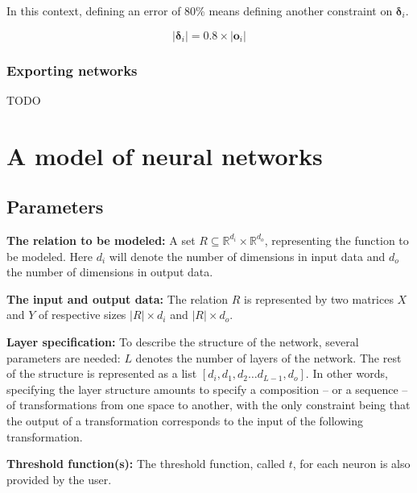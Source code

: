 \documentclass[a4paper, 10pt]{article}
\begin{document}
In this context, defining an error of 80\% means defining another constraint on
$\boldsymbol{\delta}_i$.

\begin{equation*}
    |\boldsymbol{\delta}_i| = 0.8 \times |\mathbf{o}_i| 
\end{equation*}

\subsubsection*{Exporting networks}
TODO

\section{A model of neural networks}

\subsection*{Parameters}

\begin{description}
    \item{\textbf{The relation to be modeled:}} A set $R \subseteq
        \mathbb{R}^{d_i} \times \mathbb{R}^{d_o}$, representing the function to be modeled.
        Here $d_i$ will denote the number of dimensions in input data and $d_o$
        the number of dimensions in output data.
    \item{\textbf{The input and output data:}} The relation $R$ is represented
        by two matrices $X$ and $Y$ of respective sizes $|R| \times d_i$ and $|R| \times
        d_o$. 
    \item{\textbf{Layer specification:}} To describe the structure of the network,
        several parameters are needed: $L$ denotes the number of layers of the
        network.  The rest of the structure is represented as a list $[d_i, d_1, d_2 \dots
        d_{L-1}, d_o]$. In other words, specifying the layer structure amounts to
        specify a composition -- or a sequence -- of transformations from one
        space to another, with the only constraint being that the output of a
        transformation corresponds to the input of the following transformation.
        
    \item{\textbf{Threshold function(s):}} The threshold function, called $t$, for each neuron
        is also provided by the user. 
\end{description}
\end{document}
